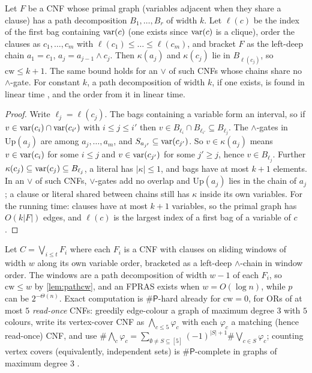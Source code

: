 \begin{lemma}\label{lem:pathcw}
Let $F$ be a CNF whose primal graph (variables adjacent when they share a clause)
has a path decomposition $B_1,\dots,B_r$ of width $k$. Let $\ell(c)$ be the index of
the first bag containing $\mathrm{var}(c)$ (one exists since $\mathrm{var}(c)$ is a clique), order the
clauses as $c_1,\dots,c_m$ with $\ell(c_1)\le\dots\le\ell(c_m)$, and bracket $F$ as the
left-deep chain $a_1=c_1$, $a_j=a_{j-1}\wedge c_j$. Then $\kappa(a_j)$ and
$\kappa(c_j)$ lie in $B_{\ell(c_j)}$, so $\mathrm{cw}\le k+1$. The same bound holds for
an $\vee$ of such CNFs whose chains share no $\wedge$-gate. For
constant $k$, a path decomposition of width $k$, if one exists, is found in linear
time \cite{bodlaender1996,bodlaenderkloks1996}, and the order from it in linear time.
\end{lemma}

\begin{proof}
Write $\ell_j=\ell(c_j)$. The bags containing a variable form an interval, so if
$v\in\mathrm{var}(c_i)\cap\mathrm{var}(c_{i'})$ with $i\le j\le i'$ then $v\in B_{\ell_i}\cap B_{\ell_{i'}}
\subseteq B_{\ell_j}$. The $\wedge$-gates in $\mathrm{Up}(a_j)$ are among $a_j,\dots,a_m$, and
$S_{a_{j'}}\subseteq\mathrm{var}(c_{j'})$. So $v\in\kappa(a_j)$ means $v\in\mathrm{var}(c_i)$ for some
$i\le j$ and $v\in\mathrm{var}(c_{j'})$ for some $j'\ge j$, hence $v\in B_{\ell_j}$. Further
$\kappa(c_j)\subseteq\mathrm{var}(c_j)\subseteq B_{\ell_j}$, a literal has $|\kappa|\le1$, and
bags have at most $k+1$ elements. In an $\vee$ of such CNFs, $\vee$-gates add no
overlap and $\mathrm{Up}(a_j)$ lies in the chain of $a_j$; a clause or
literal shared between chains still has $\kappa$ inside its own variables. For the
running time: clauses have at most $k+1$ variables, so the primal graph has
$O(k|F|)$ edges, and $\ell(c)$ is the largest index of a first bag of a variable
of $c$.
\end{proof}

\begin{example}\label{ex:or-cnf}
Let $C=\bigvee_{i\le t}F_i$ where each $F_i$ is a CNF with clauses on sliding
windows of width $w$ along its own variable order, bracketed as a left-deep
$\wedge$-chain in window order. The windows are a path decomposition of width $w-1$
of each $F_i$, so $\mathrm{cw}\le w$ by \cref{lem:pathcw}, and an FPRAS exists when
$w=O(\log n)$, while $p$ can be $2^{-\Theta(n)}$. Exact computation is $\#\mathsf
P$-hard already for $\mathrm{cw}=0$, for ORs of at most $5$ \emph{read-once} CNFs:
greedily edge-colour a graph of maximum degree $3$ with $5$ colours, write its
vertex-cover CNF as $\bigwedge_{c\le5}\varphi_c$ with each $\varphi_c$ a matching
(hence read-once) CNF, and use
$\#\bigwedge_c\varphi_c=\sum_{\emptyset\ne S\subseteq[5]}(-1)^{|S|+1}\#\bigvee_{c\in S}\varphi_c$;
counting vertex covers (equivalently, independent sets) is $\#\mathsf P$-complete
in graphs of maximum degree $3$ \cite{greenhill2000}.
\end{example}

